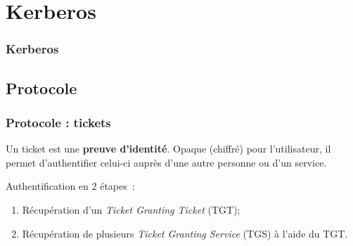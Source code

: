 \documentclass[svgnames]{beamer}
\begin{document}

\section{Kerberos}

\begin{frame}
  \frametitle{Kerberos}
  
  
\end{frame}

\subsection{Protocole}

\begin{frame}
 \frametitle{Protocole : tickets}
 
  \begin{definition}
   Un ticket est une \textbf{preuve d'identité}. Opaque (chiffré) pour l'utilisateur, 
   il permet d'authentifier celui-ci auprès d'une autre personne ou 
   d'un service.
  \end{definition}
  
  \pause

  \vfill
  
  Authentification en 2 étapes~:
  \begin{enumerate}
   \item Récupération d'un \textit{Ticket Granting Ticket} (TGT); %
   \item Récupération de plusieurs \textit{Ticket Granting Service} (TGS) à l'aide du TGT. %
  \end{enumerate}
  
\end{frame}
\end{document}
